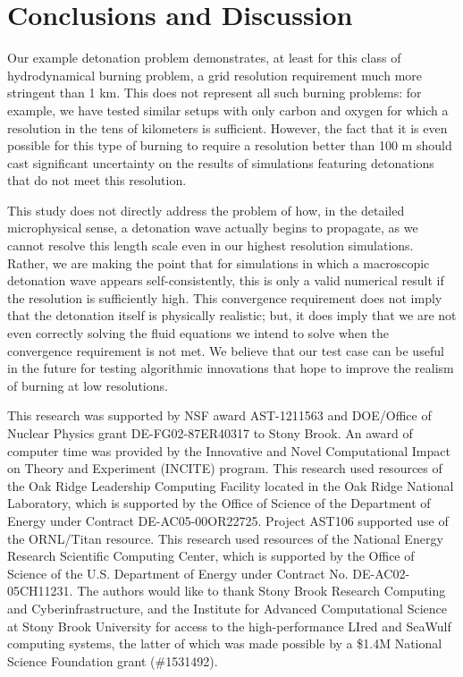 \documentclass[twocolumn,numberedappendix]{../aastex62}
\begin{document}
\section{Conclusions and Discussion}\label{Sec:Conclusions and Discussion}
\label{sec:conclusion}

Our example detonation problem demonstrates, at least for this class of
hydrodynamical burning problem, a grid resolution requirement much more stringent
than 1 km. This does not represent all such burning problems: for example, we
have tested similar setups with only carbon and oxygen for which a resolution
in the tens of kilometers is sufficient. However, the fact that it is even
possible for this type of burning to require a resolution better than 100 m
should cast significant uncertainty on the results of simulations featuring
detonations that do not meet this resolution.

This study does not directly address the problem of how, in the detailed
microphysical sense, a detonation wave actually begins to propagate, as
we cannot resolve this length scale even in our highest resolution simulations.
Rather, we are making the point that for simulations in which a macroscopic
detonation wave appears self-consistently, this is only a valid numerical result
if the resolution is sufficiently high. This convergence requirement does
not imply that the detonation itself is physically realistic; but, it does
imply that we are not even correctly solving the fluid equations we intend
to solve when the convergence requirement is not met. We believe that our
test case can be useful in the future for testing algorithmic innovations
that hope to improve the realism of burning at low resolutions.



\acknowledgments

This research was supported by NSF award AST-1211563 and DOE/Office of
Nuclear Physics grant DE-FG02-87ER40317 to Stony Brook. An award of
computer time was provided by the Innovative and Novel Computational
Impact on Theory and Experiment (INCITE) program.  This research used
resources of the Oak Ridge Leadership Computing Facility located in
the Oak Ridge National Laboratory, which is supported by the Office of
Science of the Department of Energy under Contract
DE-AC05-00OR22725. Project AST106 supported use of the ORNL/Titan
resource.  This research used resources of the National Energy
Research Scientific Computing Center, which is supported by the Office
of Science of the U.S. Department of Energy under Contract
No. DE-AC02-05CH11231. The authors would like to thank Stony Brook
Research Computing and Cyberinfrastructure, and the Institute for
Advanced Computational Science at Stony Brook University for access
to the high-performance LIred and SeaWulf computing systems, the latter
of which was made possible by a \$1.4M National Science Foundation grant (\#1531492).
\end{document}
